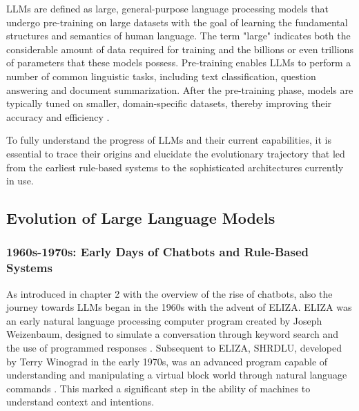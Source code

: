 LLMs are defined as large, general-purpose language processing models that undergo pre-training on large datasets with the goal of learning the fundamental structures and semantics of human language. The term "large" indicates both the considerable amount of data required for training and the billions or even trillions of parameters that these models possess. Pre-training enables LLMs to perform a number of common linguistic tasks, including text classification, question answering and document summarization. After the pre-training phase, models are typically tuned on smaller, domain-specific datasets, thereby improving their accuracy and efficiency \cite{researchgraph2024}.

To fully understand the progress of LLMs and their current capabilities, it is essential to trace their origins and elucidate the evolutionary trajectory that led from the earliest rule-based systems to the sophisticated architectures currently in use.

\subsection{Evolution of Large Language Models}

\subsubsection{1960s-1970s: Early Days of Chatbots and Rule-Based Systems}

As introduced in chapter 2 with the overview of the rise of chatbots, also the journey towards LLMs began in the 1960s with the advent of ELIZA. ELIZA was an early natural language processing computer program created by Joseph Weizenbaum, designed to simulate a conversation through keyword search and the use of programmed responses \cite{weizenbaum1966eliza}. Subsequent to ELIZA, SHRDLU, developed by Terry Winograd in the early 1970s, was an advanced program capable of understanding and manipulating a virtual block world through natural language commands \cite{winograd1972understanding}. This marked a significant step in the ability of machines to understand context and intentions.

